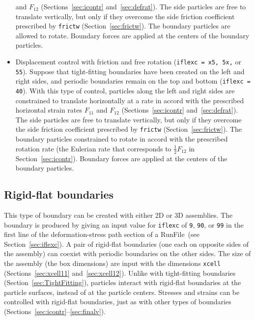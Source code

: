\documentclass[letterpaper,11pt]{article}
\newcommand{\RunFile}{\textsf{RunFile}}
\begin{document}
\begin{itemize}
and $F_{12}$ (Sections~\ref{sec:icontr} and~\ref{sec:defrat}).
The side particles are free to translate vertically, but only if they
overcome the side friction coefficient prescribed by 
\texttt{frictw} (Section~\ref{sec:frictw}).
The boundary particles are allowed to rotate.
Boundary forces are applied at the centers of the boundary particles.
\item
Displacement control with friction and free rotation
(\texttt{iflexc = x5, 5x,} or \texttt{55}).
Suppose that tight-fitting boundaries have been created on the left
and right sides, and periodic boundaries remain on the top and bottom
(\texttt{iflexc = 40}).
With this type of control, particles along the left and right sides
are constrained to translate horizontally at
a rate in accord with the prescribed horizontal strain rates $F_{11}$
and $F_{12}$ (Sections~\ref{sec:icontr} and~\ref{sec:defrat}).
The side particles are free to translate vertically, but only if they
overcome the side friction coefficient prescribed by
\texttt{frictw} (Section~\ref{sec:frictw}).
The boundary particles constrained to rotate in accord with the
prescribed rotation rate (the Eulerian rate that corresponds
to $\frac{1}{2}F_{12}$ in Section~\ref{sec:icontr}).
Boundary forces are applied at the centers of the boundary particles.
\end{itemize}
%
\subsection{Rigid-flat boundaries}\label{sec:RigidFlat}
This type of boundary can be created with either 2D or 3D assemblies.
The boundary is produced by giving an input value for 
\texttt{iflexc} of \texttt{9}, \texttt{90}, or \texttt{99}
in the first line of the deformation-stress path section
of a \RunFile\ (see Section~\ref{sec:iflexc}).
A pair of rigid-flat boundaries (one each on opposite sides of
the assembly) can coexist with periodic boundaries on the other sides.
The size of the assembly (the box dimensions) are input
with the dimensions \texttt{xcell} 
(Sections~\ref{sec:xcell11} and~\ref{sec:xcell12}).
Unlike with tight-fitting boundaries (Section~\ref{sec:TightFitting}),
particles interact with rigid-flat boundaries at the particle
surfaces, instead of at the particle centers.
Stresses and strains can be controlled with rigid-flat boundaries,
just as with other types of boundaries
(Sections~\ref{sec:icontr}--\ref{sec:finalv}).
%
\end{document}
